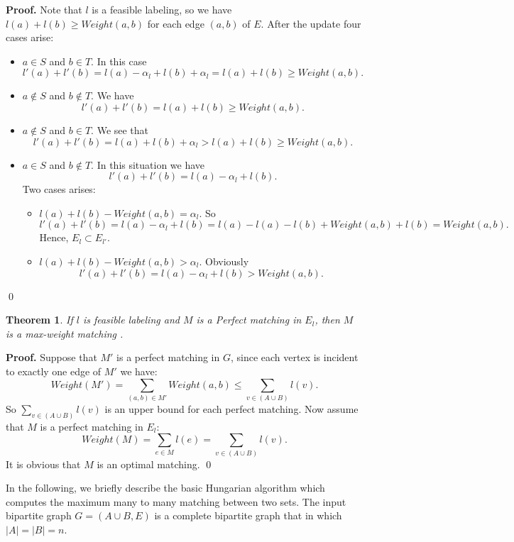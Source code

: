 \documentclass[preprint,12pt]{elsarticle}
\begin{document}
\textbf {Proof.} Note that $l$ is a feasible labeling, so we have $l(a)+l(b)\ge Weight(a,b)$ for each edge $(a,b)$ of $E$. After the update four cases arise:
\begin{itemize}
\item $a \in S$ and $b \in T$. In this case $$l'(a)+l'(b)=l(a)-\alpha_l+l(b)+\alpha_l=l(a)+l(b)\ge Weight(a,b).$$ 
\item $a \notin S$ and $b \notin T$. We have $$l'(a)+l'(b)=l(a)+l(b)\ge Weight(a,b).$$
\item $a \notin S$ and $b \in T$. We see that $$l'(a)+l'(b)=l(a)+l(b)+\alpha_l>l(a)+l(b)\ge Weight(a,b).$$
\item $a \in S$ and $b \notin T$. In this situation we have 
$$l'(a)+l'(b)=l(a)-\alpha_l+l(b).$$
Two cases arises: 
\begin{itemize}

\item $l(a)+l(b)-Weight(a,b)=\alpha_l$. So 
$$l'(a)+l'(b)=l(a)-\alpha_l+l(b)=l(a)-l(a)-l(b)+Weight(a,b)+l(b)=Weight(a,b).$$ Hence, $E_l \subset E_{l'}$.  

\item $l(a)+l(b)-Weight(a,b)>\alpha_l$. Obviously 
$$l'(a)+l'(b)=l(a)-\alpha_l+l(b)>Weight(a,b).$$

\end{itemize}

\end{itemize}
\qed

\newtheorem{theorem}{Theorem}
\begin{theorem}
If $l$ is feasible labeling and $M$ is a Perfect matching in $E_l$, then $M$ is a max-weight matching \cite{8}.
\end{theorem}
\textbf {Proof.} Suppose that $M'$ is a perfect matching in $G$, since each  vertex is incident to exactly one edge of $M'$ we have:
$$Weight(M')=\sum_{(a,b) \in M'} Weight(a,b)\le \sum_{v \in (A \cup B)}l(v).$$ So $\sum_{v \in (A \cup B)}l(v)$ is an upper bound for each perfect matching. Now assume that $M$ is a perfect matching in $E_l$:
$$Weight(M)=\sum_{e \in M}l(e)=\sum_{v \in (A \cup B)}l(v).$$ It is obvious that $M$ is an optimal matching. 
\qed

In the following, we briefly describe the basic Hungarian algorithm which computes the maximum many to many matching between two sets. The input bipartite graph $G=(A \cup B, E)$ is a complete bipartite graph that in which $|A|=|B|=n$. 


\makeatletter
\expandafter\patchcmd\csname\string\algorithmic{}
\makeatother
\end{document}
